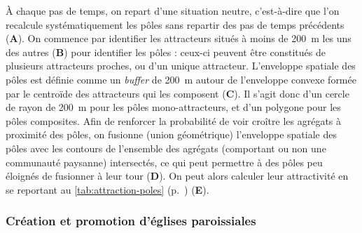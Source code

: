 À chaque pas de temps, on repart d'une situation \og neutre\fg{}, c'est-à-dire que l'on recalcule systématiquement les pôles sans repartir des pas de temps précédents (\textbf{A}).
On commence par identifier les attracteurs situés à moins de 200~m les uns des autres (\textbf{B}) pour identifier les pôles : ceux-ci peuvent être constitués de plusieurs attracteurs proches, ou d'un unique attracteur.
L'enveloppe spatiale des pôles est définie comme un \textit{buffer} de 200~m autour de l'enveloppe convexe formée par le centroïde des attracteurs qui les composent (\textbf{C}). Il s'agit donc d'un cercle de rayon de 200~m pour les pôles mono-attracteurs, et d'un polygone pour les pôles composites.
Afin de renforcer la probabilité de voir croître les agrégats à proximité des pôles, on fusionne (union géométrique) l'enveloppe spatiale des pôles avec les contours de l'ensemble des agrégats (comportant ou non une communauté paysanne) intersectés, ce qui peut permettre à des pôles peu éloignés de fusionner à leur tour (\textbf{D}).
On peut alors calculer leur attractivité en se reportant au \cref{tab:attraction-poles} (p.~\pageref{tab:attraction-poles}) (\textbf{E}).


	
	\subsubsection{Création et promotion d'églises paroissiales \label{sssec:paroisses}}
	
